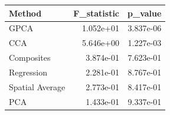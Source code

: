 \begin{tabular}{lrr}
\toprule
Method & F_statistic & p_value \\
\midrule
GPCA & 1.052e+01 & 3.837e-06 \\
CCA & 5.646e+00 & 1.227e-03 \\
Composites & 3.874e-01 & 7.623e-01 \\
Regression & 2.281e-01 & 8.767e-01 \\
Spatial Average & 2.773e-01 & 8.417e-01 \\
PCA & 1.433e-01 & 9.337e-01 \\
\bottomrule
\end{tabular}
